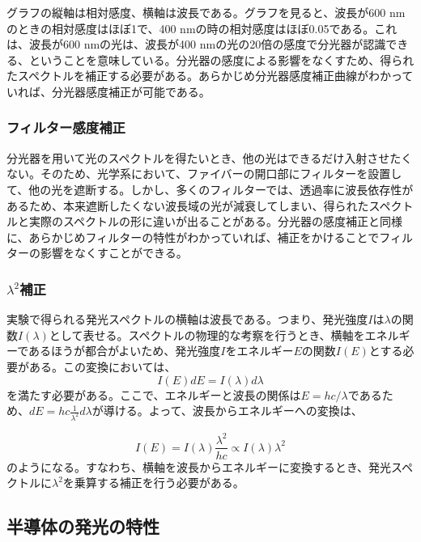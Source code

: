 \documentclass[11pt,a4j]{jsarticle}
\begin{document}
グラフの縦軸は相対感度、横軸は波長である。グラフを見ると、波長が600 nmのときの相対感度はほぼ1で、400 nmの時の相対感度はほぼ0.05である。これは、波長が600 nmの光は、波長が400 nmの光の20倍の感度で分光器が認識できる、ということを意味している。分光器の感度による影響をなくすため、得られたスペクトルを補正する必要がある。あらかじめ分光器感度補正曲線がわかっていれば、分光器感度補正が可能である。

\subsubsection{フィルター感度補正}

分光器を用いて光のスペクトルを得たいとき、他の光はできるだけ入射させたくない。そのため、光学系において、ファイバーの開口部にフィルターを設置して、他の光を遮断する。しかし、多くのフィルターでは、透過率に波長依存性があるため、本来遮断したくない波長域の光が減衰してしまい、得られたスペクトルと実際のスペクトルの形に違いが出ることがある。分光器の感度補正と同様に、あらかじめフィルターの特性がわかっていれば、補正をかけることでフィルターの影響をなくすことができる。

\subsubsection{$\lambda^2$補正}

実験で得られる発光スペクトルの横軸は波長である。つまり、発光強度$I$は$\lambda$の関数$I(\lambda)$として表せる。スペクトルの物理的な考察を行うとき、横軸をエネルギーであるほうが都合がよいため、発光強度$I$をエネルギー$E$の関数$I(E)$とする必要がある。この変換においては、
\begin{equation}
 I(E)dE=I(\lambda)d\lambda \nonumber
\end{equation}
を満たす必要がある。ここで、エネルギーと波長の関係は$E=hc/\lambda$であるため、$dE=hc\frac{1}{\lambda^2}d\lambda$が導ける。よって、波長からエネルギーへの変換は、

\begin{equation}
 I(E)=I(\lambda)\frac{\lambda^2}{hc}\propto I(\lambda)\lambda^2 \nonumber
\end{equation}
のようになる。すなわち、横軸を波長からエネルギーに変換するとき、発光スペクトルに$\lambda^2$を乗算する補正を行う必要がある。

\newpage
\subsection{半導体の発光の特性}
\end{document}
